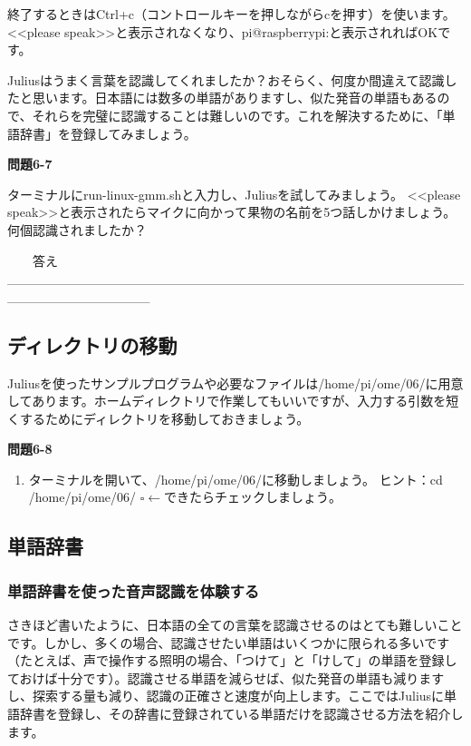 \documentclass[a4paper,dvipdfmx]{jarticle}
\newcommand\liststyleLxi{%
\renewcommand\theenumi{\arabic{enumi}}
\renewcommand\theenumii{\arabic{enumii}}
\renewcommand\theenumiii{\arabic{enumiii}}
\renewcommand\theenumiv{\arabic{enumiv}}
\renewcommand\labelenumi{\theenumi.}
\renewcommand\labelenumii{\theenumii.}
\renewcommand\labelenumiii{\theenumiii.}
\renewcommand\labelenumiv{\theenumiv.}
}
\begin{document}
{
終了するときはCtrl+c（コントロールキーを押しながらcを押す）を使います。{\textless}{\textless}please
speak{\textgreater}{\textgreater}と表示されなくなり、pi@raspberrypi:と表示されればOKです。}

{
Juliusはうまく言葉を認識してくれましたか？おそらく、何度か間違えて認識したと思います。日本語には数多の単語がありますし、似た発音の単語もあるので、それらを完璧に認識することは難しいのです。これを解決するために、「単語辞書」を登録してみましょう。}

{\bfseries
問題6-7}

{
ターミナルにrun-linux-gmm.shと入力し、Juliusを試してみましょう。\newline
{\textless}{\textless}please
speak{\textgreater}{\textgreater}と表示されたらマイクに向かって果物の名前を5つ話しかけましょう。\newline
何個認識されましたか？}

{\raggedleft{}
\ \ \ \ 答え\_\_\_\_\_\_\_\_\_\_\_\_\_\_\_\_\_\_\_\_\_\_\_\_\_\_\_\_\_\_\_\_\_\_\_\_\_\_\_\_\_\_\_\_\_\_\_\_\_\_\_\_\_\_\_\_\_\_\_\_\_\_\_
\par}

\subsection{ディレクトリの移動}
{
Juliusを使ったサンプルプログラムや必要なファイルは/home/pi/ome/06/に用意してあります。ホームディレクトリで作業してもいいですが、入力する引数を短くするためにディレクトリを移動しておきましょう。}

{\bfseries
問題6-8}

\liststyleLxi
\begin{enumerate}
\item {
ターミナルを開いて、/home/pi/ome/06/に移動しましょう。\newline
ヒント：cd /home/pi/ome/06/\newline
${\square}\leftarrow
できたらチェックしましょう。$}
\end{enumerate}
\subsection[単語辞書]{単語辞書}
\subsubsection[単語辞書を使った音声認識を体験する]{単語辞書を使った音声認識を体験する}
{
さきほど書いたように、日本語の全ての言葉を認識させるのはとても難しいことです。しかし、多くの場合、認識させたい単語はいくつかに限られる多いです（たとえば、声で操作する照明の場合、「つけて」と「けして」の単語を登録しておけば十分です）。認識させる単語を減らせば、似た発音の単語も減りますし、探索する量も減り、認識の正確さと速度が向上します。ここではJuliusに単語辞書を登録し、その辞書に登録されている単語だけを認識させる方法を紹介します。}
\end{document}
